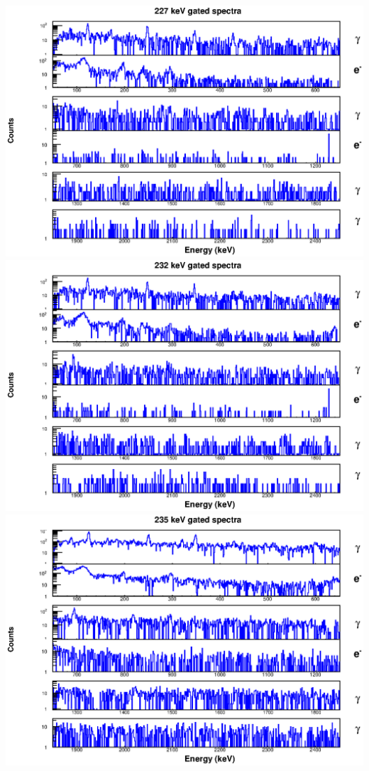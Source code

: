 \includegraphics[scale=0.8]{154Gd_Appendix/227_combined.eps}
\includegraphics[scale=0.8]{154Gd_Appendix/232_combined.eps}
\includegraphics[scale=0.8]{154Gd_Appendix/235_combined.eps}

